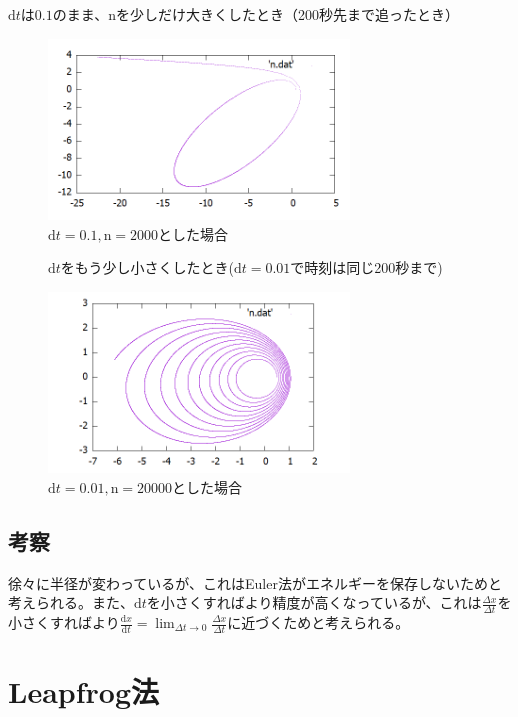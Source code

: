 \documentclass[a4paper,twoside]{jarticle}
\begin{document}
$\mathrm{d}t$は$0.1$のまま、nを少しだけ大きくしたとき（200秒先まで追ったとき）

\begin{figure}[H]
\begin{center}
\includegraphics[width=8cm]{../cpp/out/euler/euler_dt=e-1_n=2000.png}
\end{center}
\caption{$\mathrm{d}t=0.1, \mathrm{n}=2000$とした場合}
\end{figure}

\begin{figure}[H]
$\mathrm{d}t$をもう少し小さくしたとき($\mathrm{d}t=0.01$で時刻は同じ200秒まで)
\begin{center}
\includegraphics[width=8cm]{../cpp/out/euler/euler_dt=e-2_n=20000.png}
\end{center}
\caption{$\mathrm{d}t=0.01, \mathrm{n}=20000$とした場合}
\end{figure}

\subsection{考察}
徐々に半径が変わっているが、これはEuler法がエネルギーを保存しないためと考えられる。また、$\mathrm{d}t$を小さくすればより精度が高くなっているが、これは$\frac{\Delta x}{\Delta t}$を小さくすればより$\displaystyle \frac{\mathrm{d}x}{\mathrm{d}t}=\lim_{\Delta t \to 0}\frac{\Delta x}{\Delta t}$に近づくためと考えられる。

\section{Leapfrog法}
\end{document}
